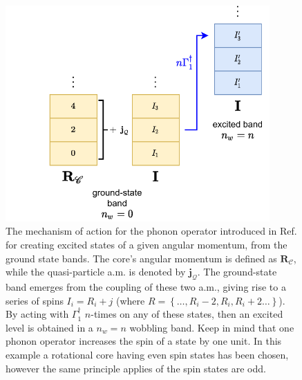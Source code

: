 \begin{figure}
    \centering
    \includegraphics[width=0.9\textwidth]{Chapters/Figures/w0_phonon_operator.pdf}
    \caption{The mechanism of action for the phonon operator introduced in Ref. \cite{raduta2017semiclassical} for creating excited states of a given angular momentum, from the ground state bands. The core's angular momentum is defined as $\mathbf{R}_\mathscr{C}$, while the quasi-particle a.m. is denoted by $\mathbf{j}_\mathcal{Q}$. The ground-state band emerges from the coupling of these two a.m., giving rise to a series of spins $I_i=R_i+j$ (where $R=\left\{\dots,R_i-2,R_i,R_i+2\dots\right\}$). By acting with $\Gamma_1^\dagger$ $n$-times on any of these states, then an excited level is obtained in a $n_w=n$ wobbling band. Keep in mind that one phonon operator increases the spin of a state by one unit. In this example a rotational core having even spin states has been chosen, however the same principle applies of the spin states are odd.}
    \label{phonon-operator-schematic}
\end{figure}

